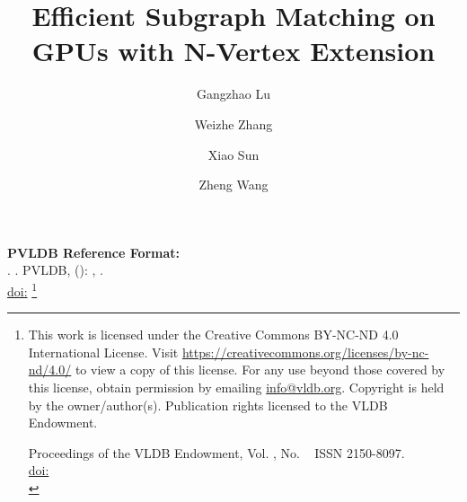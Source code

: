 \documentclass[sigconf, nonacm]{acmart}
\begin{document}
\title{Efficient Subgraph Matching on GPUs with N-Vertex Extension}
\author{Gangzhao Lu}

\author{Weizhe Zhang}

\author{Xiao Sun}

\author{Zheng Wang}


\maketitle
\pagestyle{\vldbpagestyle}
\begingroup\small\noindent\raggedright\textbf{PVLDB Reference Format:}\\
\vldbauthors. \vldbtitle. PVLDB, \vldbvolume(\vldbissue): \vldbpages, \vldbyear.\\
\href{https://doi.org/\vldbdoi}{doi:\vldbdoi}
\endgroup
\begingroup
\renewcommand\thefootnote{}\footnote{\noindent
This work is licensed under the Creative Commons BY-NC-ND 4.0 International License. Visit \url{https://creativecommons.org/licenses/by-nc-nd/4.0/} to view a copy of this license. For any use beyond those covered by this license, obtain permission by emailing \href{mailto:info@vldb.org}{info@vldb.org}. Copyright is held by the owner/author(s). Publication rights licensed to the VLDB Endowment. \\
\raggedright Proceedings of the VLDB Endowment, Vol. \vldbvolume, No. \vldbissue\ %
ISSN 2150-8097. \\
\href{https://doi.org/\vldbdoi}{doi:\vldbdoi} \\
}\addtocounter{footnote}{-1}\endgroup












\end{document}
